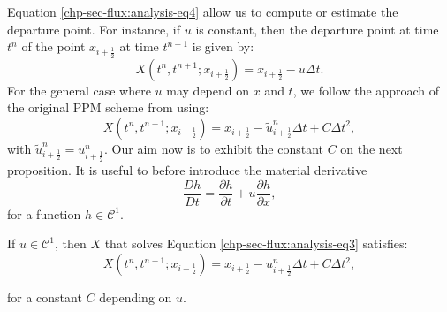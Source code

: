 Equation \eqref{chp-sec-flux:analysis-eq4} allow us to compute or estimate the departure point.
For instance, if $u$ is constant, then the departure point at time $t^n$ of the point 
$x_{i+\frac{1}{2}}$ at time $t^{n+1}$ is given by:
\begin{equation}
	\label{chp-sec-flux:departurepoint}
	X(t^n,t^{n+1};x_{i+\frac{1}{2}}) = x_{i+\frac{1}{2}} - u\Delta t.
\end{equation}
For the general case where $u$ may depend on $x$ and $t$, we follow the approach of
the original PPM scheme from \citet{colella:1984} using:
\begin{equation}
	\label{chp-sec-flux:departurepoint3}
	X(t^n,t^{n+1};x_{i+\frac{1}{2}}) = x_{i+\frac{1}{2}} - \tilde{u}^{n}_{i+\frac{1}{2}}\Delta t + C\Delta t^2,
\end{equation}
with $\tilde{u}^{n}_{i+\frac{1}{2}} = {u}^{n}_{i+\frac{1}{2}}$.
Our aim now is to exhibit the constant $C$ on the next proposition. It is useful to before introduce the material derivative
\begin{equation*}
	\frac{Dh}{Dt}  = \frac{\partial h}{\partial t} + u\frac{\partial h}{\partial x},
\end{equation*}
for a function $h \in \mathcal{C}^1$.
\begin{prop}
	\label{chp-sec-flux:dp_euler}
	If $u\in \mathcal{C}^1$, then $X$ that solves Equation \eqref{chp-sec-flux:analysis-eq3} satisfies:
	\begin{equation}
		X(t^n,t^{n+1};x_{i+\frac{1}{2}}) = x_{i+\frac{1}{2}} - {u}^{n}_{i+\frac{1}{2}}\Delta t + C\Delta t^2,
	\end{equation}
\end{prop}
for a constant $C$ depending on $u$.
